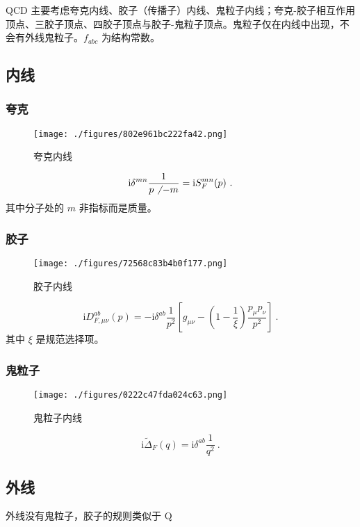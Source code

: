 

\begin{issues}
\issueMissDepend
\issueAbstract
\end{issues}

QCD 主要考虑夸克内线、胶子（传播子）内线、鬼粒子内线；夸克-胶子相互作用顶点、三胶子顶点、四胶子顶点与胶子-鬼粒子顶点。鬼粒子仅在内线中出现，不会有外线鬼粒子。$f_{abc}$ 为结构常数。

\subsection{内线}
\subsubsection{夸克}
\begin{figure}[ht]
\centering
\texttt{[image: ./figures/802e961bc222fa42.png]}
\caption{夸克内线} \label{fig_qcdfey_1}
\end{figure}
\begin{equation}
\mathrm i \delta^{mn} \frac{1}{ p\not ~- m} = \mathrm i S^{mn}_F(p)~.
\end{equation}
其中分子处的 $m$ 非指标而是质量。

\subsubsection{胶子}
\begin{figure}[ht]
\centering
\texttt{[image: ./figures/72568c83b4b0f177.png]}
\caption{胶子内线} \label{fig_qcdfey_2}
\end{figure}
\begin{equation}
\mathrm i D_{F, \mu\nu}^{ab}(p) = -\mathrm i \delta^{ab} \frac{1}{p^2} \left[ g_{\mu\nu} - \left(1-\frac{1}{\xi}\right) \frac{p_\mu p_\nu}{p^2} \right] ~.
\end{equation}
其中 $\xi$ 是规范选择项。

\subsubsection{鬼粒子}
\begin{figure}[ht]
\centering
\texttt{[image: ./figures/0222c47fda024c63.png]}
\caption{鬼粒子内线} \label{fig_qcdfey_3}
\end{figure}
\begin{equation}
\mathrm i \widetilde{\Delta}_F(q) = \mathrm i \delta^{ab} \frac{1}{q^2} ~.
\end{equation}

\subsection{外线}
外线没有鬼粒子，胶子的规则类似于 Q
